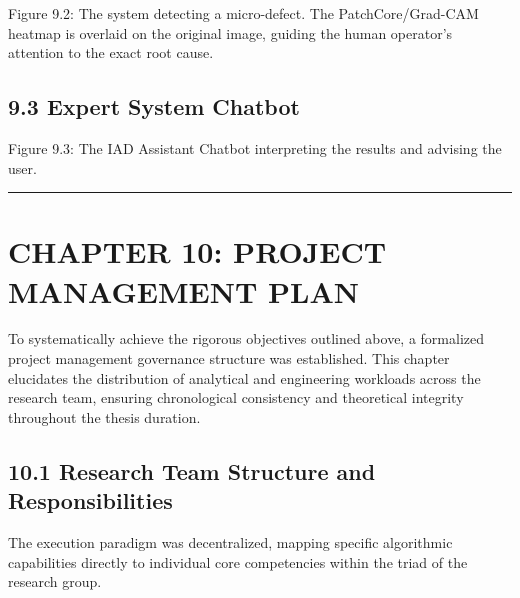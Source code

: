 Figure 9.2: The system detecting a micro-defect. The PatchCore/Grad-CAM heatmap is overlaid on the original image, guiding the human operator's attention to the exact root cause.

\subsection{9.3 Expert System Chatbot}\label{expert-system-chatbot}

Figure 9.3: The IAD Assistant Chatbot interpreting the results and advising the user.

\begin{center}\rule{0.5\linewidth}{0.5pt}\end{center}

\section{CHAPTER 10: PROJECT MANAGEMENT PLAN}\label{chapter-10-project-management-plan}

To systematically achieve the rigorous objectives outlined above, a formalized project management governance structure was established. This chapter elucidates the distribution of analytical and engineering workloads across the research team, ensuring chronological consistency and theoretical integrity throughout the thesis duration.

\subsection{10.1 Research Team Structure and Responsibilities}\label{research-team-structure-and-responsibilities}

The execution paradigm was decentralized, mapping specific algorithmic capabilities directly to individual core competencies within the triad of the research group.

